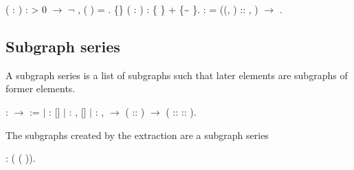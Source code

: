 \begin{coqdoccode}
\coqdocnoindent
{}  ( : )  :\coqdoceol
\coqdocindent{1.00em}
 > 0 \ensuremath{\rightarrow} \ensuremath{\lnot} \coqdoctac{\ensuremath{\exists}} ,   (  ) =  .\coqdoceol
\coqdocemptyline
\coqdocnoindent
{}  \{\} ( :  ) : \{ \} + \{\~{}  \}.\coqdoceol
\coqdocemptyline
\coqdocnoindent
{}        :\coqdoceol
\coqdocindent{1.00em}
   = ((, ) :: , ) \ensuremath{\rightarrow}   .\coqdoceol
\coqdocemptyline
\end{coqdoccode}
\subsection{Subgraph series}

 A subgraph series is a list of subgraphs such that later elements
    are subgraphs of former elements.
\begin{coqdoccode}
\coqdocemptyline
\coqdocnoindent
{}  :   \ensuremath{\rightarrow}  :=\coqdoceol
\coqdocnoindent
\ensuremath{|}  :  []\coqdoceol
\coqdocnoindent
\ensuremath{|}  : \coqdockw{\ensuremath{\forall}} ,  []\coqdoceol
\coqdocnoindent
\ensuremath{|}  : \coqdockw{\ensuremath{\forall}}   ,    \ensuremath{\rightarrow}  ( :: ) \ensuremath{\rightarrow}  ( ::  :: ).\coqdoceol
\coqdocemptyline
\end{coqdoccode}
The subgraphs created by the extraction are a subgraph series
\begin{coqdoccode}
\coqdocemptyline
\coqdocnoindent
{}    :\coqdoceol
\coqdocindent{1.00em}
 (  (  )).\coqdoceol
\coqdocemptyline
\end{coqdoccode}
